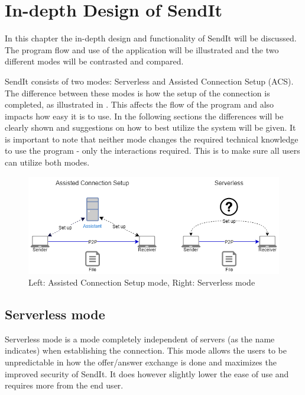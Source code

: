%
\chapter{In-depth Design of SendIt} %
%


\label{Chapter4} %
%
In this chapter the in-depth design and functionality of SendIt will be discussed. The program flow and use of the application will be illustrated and the two different modes will be contrasted and compared.

SendIt consists of two modes: Serverless and Assisted Connection Setup (ACS). The difference between these modes is how the setup of the connection is completed, as illustrated in . This affects the flow of the program and also impacts how easy it is to use. In the following sections the differences will be clearly shown and suggestions on how to best utilize the system will be given. It is important to note that neither mode changes the required technical knowledge to use the program - only the interactions required. This is to make sure all users can utilize both modes.

%
\begin{figure}
	\centering
	\includegraphics[width=\textwidth]{Figures/SendIt_mode_comparison}
	\caption[SendIt mode comparison]{Left: Assisted Connection Setup mode, Right: Serverless mode} \label{fig:mode_comparison}
\end{figure}

%
\section{Serverless mode}
%
Serverless mode is a mode completely independent of servers (as the name indicates) when establishing the connection. This mode allows the users to be unpredictable in how the offer/answer exchange is done and maximizes the improved security of SendIt. It does however slightly lower the ease of use and requires more from the end user.
%
